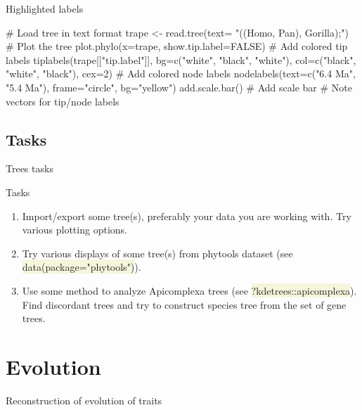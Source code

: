 \documentclass[compress, ucs, xelatex, 11pt, xcolor=svgnames, aspectratio=169,
	hyperref={
		bookmarks=true,
		unicode=true,
		colorlinks=true,
		pdftitle={Molecular data in R},
		plainpages=false,
		pdfauthor={Vojtech Zeisek},
		pdfsubject={Course about phylogeny and evolution in R},
		pdfcreator={XeLaTeX},
		pdfkeywords={R, evolution, phylogeny, molecular data},
		linkcolor=Crimson, %
		anchorcolor=Magenta, %
		citecolor=Magenta, %
		filecolor=Magenta, %
		menucolor=Magenta, %
		urlcolor=DodgerBlue, %
		pdftex},
	url={hyphens, lowtilde} %
	]{beamer}
\renewcommand{\texttt}[1]{\colorbox{Beige}{{\ttfamily #1}}}
\begin{document}
\begin{frame}[fragile]{Highlighted labels}
	\begin{multicols}{2}
		\vfill
		\begin{center}
			\texttt{[image: highlight.png]}
		\end{center}
		\vfill
		\begin{spluscode}
    # Load tree in text format
    trape <- read.tree(text=
      "((Homo, Pan), Gorilla);")
    # Plot the tree
    plot.phylo(x=trape,
      show.tip.label=FALSE)
    # Add colored tip labels
    tiplabels(trape[["tip.label"]],
      bg=c("white", "black",
      "white"), col=c("black",
      "white", "black"), cex=2)
    # Add colored node labels
    nodelabels(text=c("6.4 Ma",
      "5.4 Ma"), frame="circle",
      bg="yellow")
    add.scale.bar() # Add scale bar
    # Note vectors for tip/node labels
		\end{spluscode}
	\end{multicols}
\end{frame}

\subsection{Tasks}

\begin{frame}{Trees tasks}
	\begin{exampleblock}{Tasks}
		\begin{enumerate}
			\item Import/export some tree(s), preferably your data you are working with. Try various plotting options.
			\item Try various displays of some tree(s) from phytools dataset (see \texttt{data(package="phytools")}).
			\item Use some method to analyze Apicomplexa trees (see \texttt{?kdetrees::apicomplexa}). Find discordant trees and try to construct species tree from the set of gene trees.
		\end{enumerate}
	\end{exampleblock}
\end{frame}

\section{Evolution}

\begin{frame}{Reconstruction of evolution of traits}
	\tableofcontents[currentsection, sectionstyle=show/hide, hideothersubsections]
\end{frame}
\end{document}
